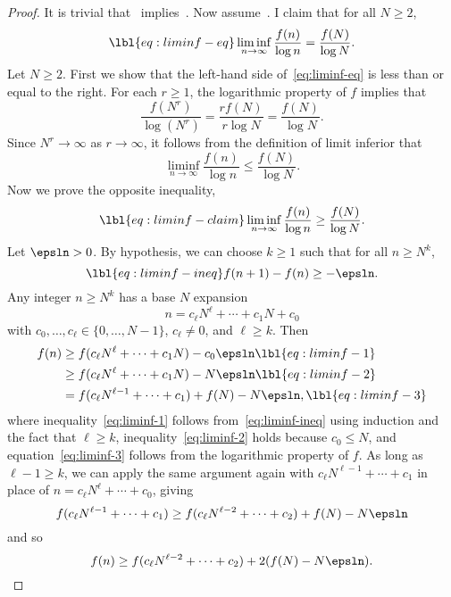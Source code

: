 \begin{proof}
It is trivial that~
implies~.  Now
assume~.  I claim that for all $N \geq 2$,
% 
\begin{equation}
\lbl{eq:liminf-eq}
\liminf_{n \to \infty} \frac{f(n)}{\log n}
=
\frac{f(N)}{\log N}.
\end{equation}
% 
Let $N \geq 2$.  First we show that the left-hand side
of~\eqref{eq:liminf-eq} is less than or equal to the right.  For each $r
\geq 1$, the logarithmic property of $f$ implies that
\[
\frac{f(N^r)}{\log(N^r)}
=
\frac{rf(N)}{r\log N}
=
\frac{f(N)}{\log N}.
\]
Since $N^r \to \infty$ as $r \to \infty$, it follows from the definition of
limit inferior that
\[
\liminf_{n \to \infty} \frac{f(n)}{\log n}
\leq
\frac{f(N)}{\log N}.
\]
Now we prove the opposite inequality, 
% 
\begin{equation}
\lbl{eq:liminf-claim}
\liminf_{n \to \infty} \frac{f(n)}{\log n} 
\geq
\frac{f(N)}{\log N}.
\end{equation}
% 
Let $\epsln > 0$.  By hypothesis, we can choose $k \geq 1$ such that for
all $n \geq N^k$,
% 
\begin{equation}
\lbl{eq:liminf-ineq}
f(n + 1) - f(n) \geq -\epsln.
\end{equation}
% 
Any integer $n \geq N^k$ has a base $N$ expansion
\[
n = c_\ell N^\ell + \cdots + c_1 N + c_0
\]
with $c_0, \ldots, c_\ell \in \{0, \ldots, N - 1\}$, $c_\ell \neq 0$,
and $\ell \geq k$.  Then
% 
\begin{align}
f(n)    &
\geq
f(c_\ell N^\ell + \cdots + c_1 N) - c_0 \epsln  
\lbl{eq:liminf-1}     \\
&
\geq
f(c_\ell N^\ell + \cdots + c_1 N) - N \epsln  
\lbl{eq:liminf-2}     \\
&
=
f(c_\ell N^{\ell - 1} + \cdots + c_1) + f(N) - N \epsln,  
\lbl{eq:liminf-3}
\end{align}
% 
where inequality~\eqref{eq:liminf-1} follows from~\eqref{eq:liminf-ineq}
using induction and the fact that $\ell \geq k$,
inequality~\eqref{eq:liminf-2} holds because $c_0 \leq N$, and
equation~\eqref{eq:liminf-3} follows from the logarithmic property of $f$.
As long as $\ell - 1 \geq k$, we can apply the same argument again with
$c_\ell N^{\ell - 1} + \cdots + c_1$ in place of $n = c_\ell N^\ell +
\cdots + c_0$, giving
\[
f(c_\ell N^{\ell - 1} + \cdots + c_1)
\geq
f(c_\ell N^{\ell - 2} + \cdots + c_2) + f(N) - N\epsln
\]
and so
\[
f(n)
\geq
f(c_\ell N^{\ell - 2} + \cdots + c_2) + 2(f(N) - N\epsln).
\]
\end{proof}

